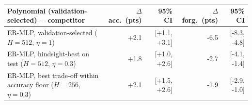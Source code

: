 \begin{tabular}{@{}lrrrr@{}}
\toprule
Polynomial (validation-selected) $-$ competitor & $\Delta$ acc.\ (pts) & 95\% CI & $\Delta$ forg.\ (pts) & 95\% CI \\
\midrule
ER-MLP, validation-selected ($H=512$, $\eta=1$) & +2.1 & [+1.1, +3.1] & -6.5 & [-8.3, -4.8] \\
ER-MLP, hindsight-best on test ($H=512$, $\eta=0.3$) & +1.8 & [+1.0, +2.6] & -2.7 & [-4.1, -1.4] \\
ER-MLP, best trade-off within accuracy floor ($H=256$, $\eta=0.3$) & +2.1 & [+1.5, +2.6] & -1.9 & [-2.9, -1.0] \\
\bottomrule
\end{tabular}
